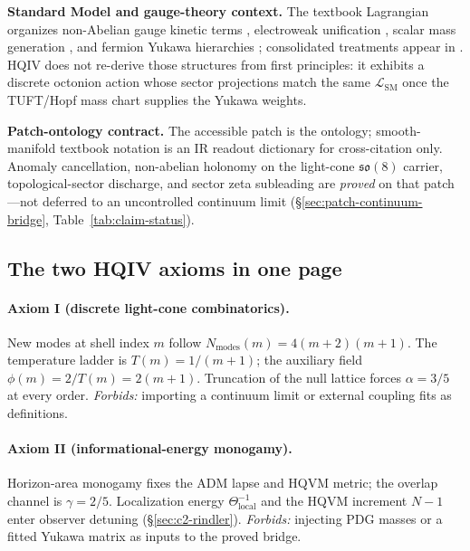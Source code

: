 \documentclass[11pt]{amsart}
\begin{document}
\noindent\textbf{Standard Model and gauge-theory context.}
The textbook Lagrangian organizes non-Abelian gauge kinetic terms \cite{yang1954,tHooft1971,tHooft1972,gross1973,politzer1973,wilczek1973}, electroweak unification \cite{glashow1961,weinberg1967,salam1968,fermi1934}, scalar mass generation \cite{higgs1964,englert1964,nambu1960,goldstone1961}, and fermion Yukawa hierarchies \cite{yukawa1935,cabibbo1963,kobayashi1973,gellmann1964}; consolidated treatments appear in \cite{pdg2024,peskin1995,schwartz2014}. HQIV does not re-derive those structures from first principles: it exhibits a discrete octonion action whose sector projections match the same $\mathcal{L}_{\mathrm{SM}}$ once the TUFT/Hopf mass chart supplies the Yukawa weights.

\noindent\textbf{Patch-ontology contract.}
The accessible patch is the ontology; smooth-manifold textbook notation is an IR readout dictionary for cross-citation only. Anomaly cancellation, non-abelian holonomy on the light-cone $\mathfrak{so}(8)$ carrier, topological-sector discharge, and sector zeta subleading are \emph{proved} on that patch---not deferred to an uncontrolled continuum limit (§\ref{sec:patch-continuum-bridge}, Table~\ref{tab:claim-status}).

\subsection{The two HQIV axioms in one page}
\label{sec:two-axioms}

\paragraph{Axiom I (discrete light-cone combinatorics).}
New modes at shell index $m$ follow $N_{\mathrm{modes}}(m)=4(m+2)(m+1)$. The temperature ladder is $T(m)=1/(m+1)$; the auxiliary field $\phi(m)=2/T(m)=2(m+1)$. Truncation of the null lattice forces $\alpha=3/5$ at every order. \emph{Forbids:} importing a continuum limit or external coupling fits as definitions.

\paragraph{Axiom II (informational-energy monogamy).}
Horizon-area monogamy fixes the ADM lapse and HQVM metric; the overlap channel is $\gamma=2/5$. Localization energy $\Theta_{\mathrm{local}}^{-1}$ and the HQVM increment $N-1$ enter observer detuning (\S\ref{sec:c2-rindler}). \emph{Forbids:} injecting PDG masses \cite{pdg2024} or a fitted Yukawa matrix \cite{yukawa1935,cabibbo1963,kobayashi1973} as inputs to the proved bridge.
\end{document}
